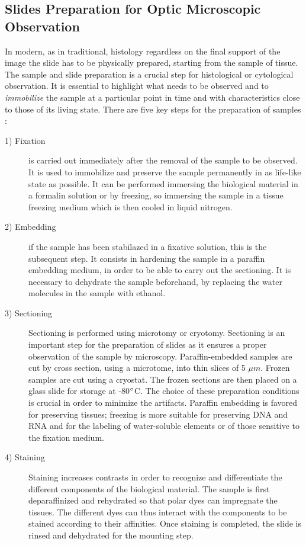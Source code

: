 \documentclass[12pt,a4paper]{report}
\begin{document}
\subsection{Slides Preparation for Optic Microscopic Observation} \label{ssec:samp_prep}
In modern, as in traditional, histology regardless on the final support of the image the slide has to be physically prepared, starting from the sample of tissue. The sample and slide preparation is a crucial step for histological or cytological observation. It is essential to highlight what needs to be observed and to \textit{immobilize} the sample at a particular point in time and with characteristics close to those of its living state. There are five key steps for the preparation of samples \cite{Alturkistani2015}:
\begin{description}
    \item [1) Fixation] is carried out immediately after the removal of the sample to be observed. It is used to immobilize and preserve the sample permanently in as life-like state as possible. It can be performed immersing the biological material in a formalin solution or by freezing, so immersing the sample in a tissue freezing medium which is then cooled in liquid nitrogen.

    \item [2) Embedding] if the sample has been stabilazed in a fixative solution, this is the subsequent step. It consists in hardening the sample in a paraffin embedding medium, in order to be able to carry out the sectioning. It is necessary to dehydrate the sample beforehand, by replacing the water molecules in the sample with ethanol.

    \item [3) Sectioning] Sectioning is performed using microtomy or cryotomy. Sectioning is an important step for the preparation of slides as it ensures a proper observation of the sample by microscopy. Paraffin-embedded samples are cut by cross section, using a microtome, into thin slices of 5 $\mu m$. Frozen samples are cut using a cryostat. The frozen sections are then placed on a glass slide for storage at -80$\degree$C. The choice of these preparation conditions is crucial in order to minimize the artifacts. Paraffin embedding is favored for preserving tissues; freezing is more suitable for preserving DNA and RNA and for the labeling of water-soluble elements or of those sensitive to the fixation medium.

    \item [4) Staining] Staining increases contrasts in order to recognize and differentiate the different components of the biological material. The sample is first deparaffinized and rehydrated so that polar dyes can impregnate the tissues. The different dyes can thus interact with the components to be stained according to their affinities. Once staining is completed, the slide is rinsed and dehydrated for the mounting step.

\end{description}
\end{document}
